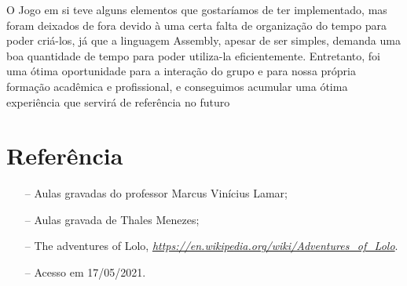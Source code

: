 \documentclass[10pt, conference, compsocconf]{IEEEtran}
\begin{document}
O Jogo em si teve alguns elementos que gostaríamos de ter implementado, mas
foram deixados de fora devido à uma certa falta de organização do tempo para
poder criá-los, já que a linguagem Assembly, apesar de ser simples, demanda uma
boa quantidade de tempo para poder utiliza-la eficientemente. Entretanto, foi
uma ótima oportunidade para a interação do grupo e para nossa própria formação
acadêmica e profissional, e conseguimos acumular uma ótima experiência que
servirá de referência no futuro


\section{Referência}
\label{sec:Conclusao}
\begin{itemize}
    \item[--] Aulas gravadas do professor Marcus Vinícius Lamar;
    \item[--] Aulas gravada de Thales Menezes;
    \item[--] The adventures of Lolo, \textit{\url{https://en.wikipedia.org/wiki/Adventures_of_Lolo}}.
    \item[--] Acesso em 17/05/2021.
    
\end{itemize}



%


\end{document}
